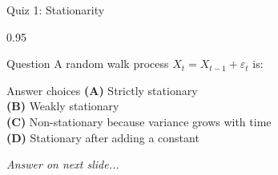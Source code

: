 \documentclass[9pt, aspectratio=169, t]{beamer}
\begin{document}
\begin{frame}{Quiz 1: Stationarity}
    \begin{cminipage}{0.95\textwidth}
    \begin{alertblock}{Question}
        A random walk process $X_t = X_{t-1} + \varepsilon_t$ is:
    \end{alertblock}

    \vspace{0.4cm}

    \begin{block}{Answer choices}
        \textcolor{MainBlue}{\textbf{(A)}} Strictly stationary\\[3pt]
        \textcolor{MainBlue}{\textbf{(B)}} Weakly stationary\\[3pt]
        \textcolor{MainBlue}{\textbf{(C)}} Non-stationary because variance grows with time\\[3pt]
        \textcolor{MainBlue}{\textbf{(D)}} Stationary after adding a constant
    \end{block}

    \vspace{0.5cm}

    \begin{center}
        \textit{Answer on next slide...}
    \end{center}
    \end{cminipage}
\end{frame}
\end{document}
